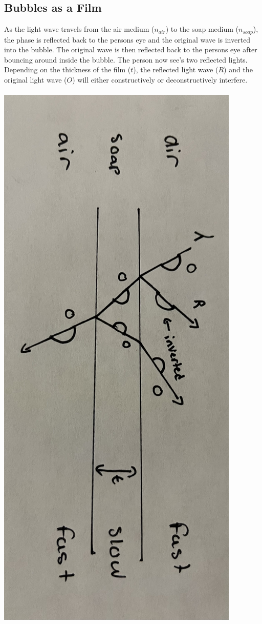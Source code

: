 \documentclass{article}
\begin{document}
\subsection{Bubbles as a Film}
As the light wave travels from the air medium ($n_{air}$) to the soap medium ($n_{soap}$), the phase is reflected back to the persons eye and the original wave is inverted into the bubble. The original wave is then reflected back to the persons eye after bouncing around inside the bubble. The person now see's two reflected lights. Depending on the thickness of the film ($t$), the reflected light wave ($R$) and the original light wave ($O$) will either constructively or deconstructively interfere.\\\\
\includegraphics[scale=0.05, angle=90, origin=c]{images/bubble_lens}
\end{document}
